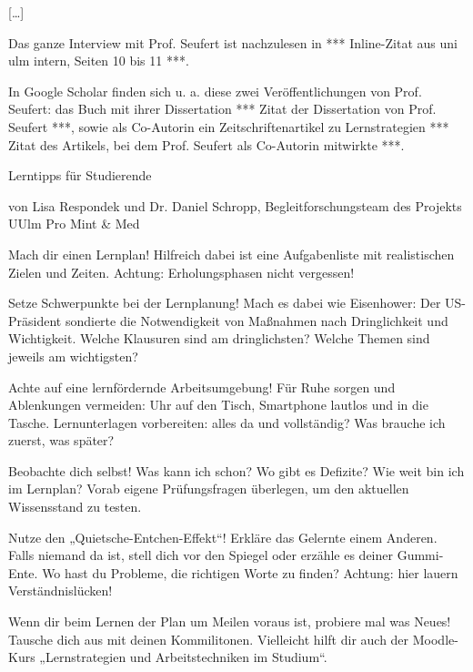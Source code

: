 [\ldots]

Das ganze Interview mit Prof. Seufert ist nachzulesen in *** Inline-Zitat aus uni ulm intern, Seiten 10 bis 11 ***.

In Google Scholar  finden sich u. a. diese zwei Veröffentlichungen von Prof. Seufert:  das Buch mit ihrer Dissertation *** Zitat der Dissertation von Prof. Seufert ***, sowie als Co-Autorin ein Zeitschriftenartikel zu Lernstrategien *** Zitat des Artikels, bei dem  Prof. Seufert als Co-Autorin mitwirkte ***.


Lerntipps für Studierende

von  Lisa Respondek und Dr. Daniel Schropp, Begleitforschungsteam des Projekts UUlm Pro Mint & Med
\begin{???}
\item Mach dir einen Lernplan! Hilfreich dabei ist eine Aufgabenliste mit realistischen Zielen und Zeiten. Achtung: Erholungsphasen nicht vergessen!

\item Setze Schwerpunkte bei der Lernplanung! Mach es dabei wie Eisenhower: Der US-Präsident sondierte die Notwendigkeit von Maßnahmen nach Dringlichkeit und Wichtigkeit. Welche Klausuren sind am dringlichsten? Welche Themen sind jeweils am wichtigsten?

\item Achte auf eine lernfördernde Arbeitsumgebung! Für Ruhe sorgen und Ablenkungen vermeiden: Uhr auf den Tisch, Smartphone lautlos und in die Tasche. Lernunterlagen vorbereiten: alles da und vollständig? Was brauche ich zuerst, was später?

\item Beobachte dich selbst! Was kann ich schon? Wo gibt es Defizite? Wie weit bin ich im Lernplan? Vorab eigene Prüfungsfragen überlegen, um den aktuellen Wissensstand zu testen.

\item Nutze den „Quietsche-Entchen-Effekt“! Erkläre das Gelernte einem Anderen. Falls niemand da ist, stell dich vor den Spiegel oder erzähle es deiner Gummi-Ente. Wo hast du Probleme, die richtigen Worte zu finden? Achtung: hier lauern Verständnislücken!

\item Wenn dir beim Lernen der Plan um Meilen voraus ist, probiere mal was Neues! Tausche dich aus mit deinen Kommilitonen. Vielleicht hilft dir auch der Moodle-Kurs „Lernstrategien und Arbeitstechniken im Studium“.

\end{???}